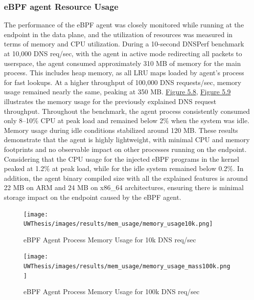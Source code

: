 \documentclass [11pt, proquest] {uwthesis}[2020/02/24]
\begin{document}
\subsubsection{eBPF agent Resource Usage}
The performance of the eBPF agent was closely monitored while running at the endpoint in the data plane, and the utilization of resources was measured in terms of memory and CPU utilization. During a 10-second DNSPerf benchmark at 10,000 DNS req/sec, with the agent in active mode redirecting all packets to userspace, the agent consumed approximately 310 MB of memory for the main process. This includes heap memory, as all LRU maps loaded by agent's process for fast lookups. At a higher throughput of 100,000 DNS requests/sec, memory usage remained nearly the same, peaking at 350 MB. \hyperref[fig:mem10k]{Figure 5.8},  \hyperref[fig:mem100k]{Figure 5.9} illustrates the memory usage for the previously explained DNS request throughput. Throughout the benchmark, the agent process consistently consumed only 8–10\% CPU at peak load and remained below 2\% when the system was idle. Memory usage during idle conditions stabilized around 120 MB. These results demonstrate that the agent is highly lightweight, with minimal CPU and memory footprints and no observable impact on other processes running on the endpoint. Considering that the CPU usage for the injected eBPF programs in the kernel peaked at 1.2\% at peak load, while for the idle system remained below 0.2\%. In addition, the agent binary compiled size with all the explained features is around 22 MB on ARM and 24 MB on x86\_64 architectures, ensuring there is minimal storage impact on the endpoint caused by the eBPF agent.

\begin{figure}[H]
  \centering
  \begin{minipage}[b]{0.48\textwidth}
    \centering
    \texttt{[image: UWThesis/images/results/mem\_usage/memory\_usage10k.png]}
    \caption{eBPF Agent Process Memory Usage for 10k DNS req/sec}
    \label{fig:mem10k}
  \end{minipage}
  \hfill
  \begin{minipage}[b]{0.48\textwidth}
    \centering
    \texttt{[image: UWThesis/images/results/mem\_usage/memory\_usage\_mass100k.png]}
    \caption{eBPF Agent Process Memory Usage for 100k DNS req/sec}
    \label{fig:mem100k}
  \end{minipage}
\end{figure}
\end{document}
